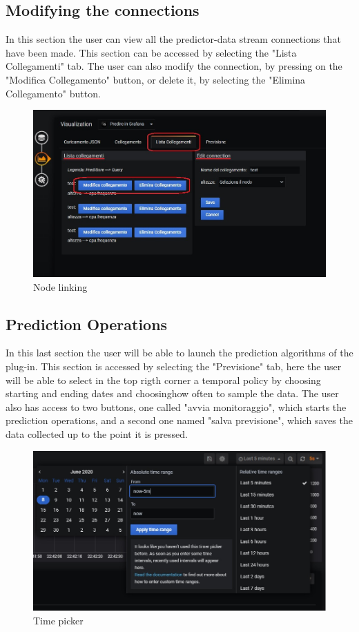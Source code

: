 \subsection{Modifying the connections}
In this section the user can view all the predictor-data stream connections that have been made. This section can be accessed by selecting the "Lista Collegamenti" tab.
The user can also modify the connection, by pressing on the "Modifica Collegamento" button, or delete it, by selecting the "Elimina Collegamento" button.

\begin{figure}[H]
\centering
\includegraphics[scale=0.75]{img/plug-in/collegamento_node.jpg}
\caption{Node linking}
\end{figure}


\subsection{Prediction Operations}
In this last section the user will be able to launch the prediction algorithms of the plug-in. This section is accessed by selecting the "Previsione" tab, here the user will be able to select in the top rigth corner a temporal policy by choosing starting and ending dates and choosinghow often to sample the data. The user  also has access to two buttons, one called "avvia monitoraggio", which starts the prediction operations, and a second one named "salva previsione", which saves the data collected up to the point it is pressed.

\begin{figure}[H]
\centering
\includegraphics[scale=0.50]{img/plug-in/time_selector.jpg}
\caption{Time picker}
\end{figure}

